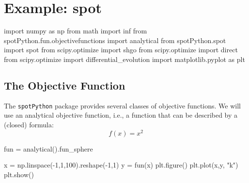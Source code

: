 \documentclass[
  letterpaper,
  DIV=11,
  numbers=noendperiod]{scrreprt}
\newenvironment{Shaded}{\begin{snugshade}}{\end{snugshade}}
\newcommand{\DecValTok}[1]{\textcolor[rgb]{0.68,0.00,0.00}{#1}}
\newcommand{\ImportTok}[1]{\textcolor[rgb]{0.00,0.46,0.62}{#1}}
\newcommand{\NormalTok}[1]{\textcolor[rgb]{0.00,0.23,0.31}{#1}}
\newcommand{\OperatorTok}[1]{\textcolor[rgb]{0.37,0.37,0.37}{#1}}
\newcommand{\StringTok}[1]{\textcolor[rgb]{0.13,0.47,0.30}{#1}}
\begin{document}
\hypertarget{example-spot}{%
\section{Example: spot}\label{example-spot}}

\begin{Shaded}
\begin{Highlighting}[]
\ImportTok{import}\NormalTok{ numpy }\ImportTok{as}\NormalTok{ np}
\ImportTok{from}\NormalTok{ math }\ImportTok{import}\NormalTok{ inf}
\ImportTok{from}\NormalTok{ spotPython.fun.objectivefunctions }\ImportTok{import}\NormalTok{ analytical}
\ImportTok{from}\NormalTok{ spotPython.spot }\ImportTok{import}\NormalTok{ spot}
\ImportTok{from}\NormalTok{ scipy.optimize }\ImportTok{import}\NormalTok{ shgo}
\ImportTok{from}\NormalTok{ scipy.optimize }\ImportTok{import}\NormalTok{ direct}
\ImportTok{from}\NormalTok{ scipy.optimize }\ImportTok{import}\NormalTok{ differential\_evolution}
\ImportTok{import}\NormalTok{ matplotlib.pyplot }\ImportTok{as}\NormalTok{ plt}
\end{Highlighting}
\end{Shaded}

\hypertarget{the-objective-function}{%
\subsection{The Objective Function}\label{the-objective-function}}

The \texttt{spotPython} package provides several classes of objective
functions. We will use an analytical objective function, i.e., a
function that can be described by a (closed) formula: \[f(x) = x^2\]

\begin{Shaded}
\begin{Highlighting}[]
\NormalTok{fun }\OperatorTok{=}\NormalTok{ analytical().fun\_sphere}
\end{Highlighting}
\end{Shaded}

\begin{Shaded}
\begin{Highlighting}[]
\NormalTok{x }\OperatorTok{=}\NormalTok{ np.linspace(}\OperatorTok{{-}}\DecValTok{1}\NormalTok{,}\DecValTok{1}\NormalTok{,}\DecValTok{100}\NormalTok{).reshape(}\OperatorTok{{-}}\DecValTok{1}\NormalTok{,}\DecValTok{1}\NormalTok{)}
\NormalTok{y }\OperatorTok{=}\NormalTok{ fun(x)}
\NormalTok{plt.figure()}
\NormalTok{plt.plot(x,y, }\StringTok{"k"}\NormalTok{)}
\NormalTok{plt.show()}
\end{Highlighting}
\end{Shaded}
\end{document}
